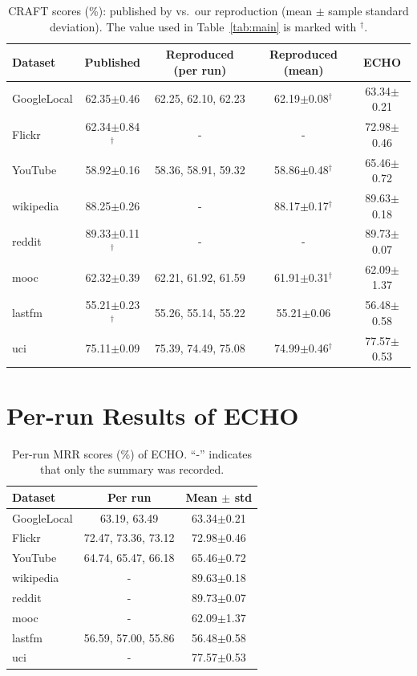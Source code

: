 \documentclass[twoside]{article}
\newcommand{\ours}{ECHO}
\begin{document}
\begin{table}[h]
\caption{CRAFT scores (\%): published by \citet{yi2025craft} vs.\ our reproduction (mean $\pm$ sample standard deviation). The value used in Table~\ref{tab:main} is marked with $^{\dagger}$.}
\label{tab:repro}
\begin{center}
\small
\begin{tabular}{lcccc}
\toprule
Dataset & Published & Reproduced (per run) & Reproduced (mean) & \ours{} \\
\midrule
GoogleLocal & 62.35$\pm$0.46 & 62.25, 62.10, 62.23 & 62.19$\pm$0.08$^{\dagger}$ & 63.34$\pm$0.21 \\
Flickr & 62.34$\pm$0.84$^{\dagger}$ & - & - & 72.98$\pm$0.46 \\
YouTube & 58.92$\pm$0.16 & 58.36, 58.91, 59.32 & 58.86$\pm$0.48$^{\dagger}$ & 65.46$\pm$0.72 \\
wikipedia & 88.25$\pm$0.26 & - & 88.17$\pm$0.17$^{\dagger}$ & 89.63$\pm$0.18 \\
reddit & 89.33$\pm$0.11$^{\dagger}$ & - & - & 89.73$\pm$0.07 \\
mooc & 62.32$\pm$0.39 & 62.21, 61.92, 61.59 & 61.91$\pm$0.31$^{\dagger}$ & 62.09$\pm$1.37 \\
lastfm & 55.21$\pm$0.23$^{\dagger}$ & 55.26, 55.14, 55.22 & 55.21$\pm$0.06 & 56.48$\pm$0.58 \\
uci & 75.11$\pm$0.09 & 75.39, 74.49, 75.08 & 74.99$\pm$0.46$^{\dagger}$ & 77.57$\pm$0.53 \\
\bottomrule
\end{tabular}
\end{center}
\end{table}

\section{Per-run Results of \ours{}}

\begin{table}[h]
\caption{Per-run MRR scores (\%) of \ours{}. ``-'' indicates that only the summary was recorded.}
\label{tab:perrun}
\begin{center}
\small
\begin{tabular}{lcc}
\toprule
Dataset & Per run & Mean $\pm$ std \\
\midrule
GoogleLocal & 63.19, 63.49 & 63.34$\pm$0.21 \\
Flickr & 72.47, 73.36, 73.12 & 72.98$\pm$0.46 \\
YouTube & 64.74, 65.47, 66.18 & 65.46$\pm$0.72 \\
wikipedia & - & 89.63$\pm$0.18 \\
reddit & - & 89.73$\pm$0.07 \\
mooc & - & 62.09$\pm$1.37 \\
lastfm & 56.59, 57.00, 55.86 & 56.48$\pm$0.58 \\
uci & - & 77.57$\pm$0.53 \\
\bottomrule
\end{tabular}
\end{center}
\end{table}
\end{document}
